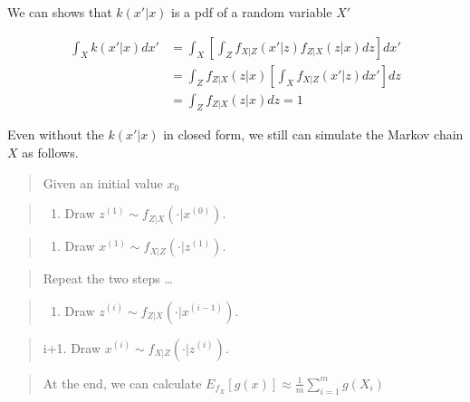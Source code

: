 \documentclass[12pt]{article}
\providecommand{\tightlist}{%
  \setlength{\itemsep}{0pt}\setlength{\parskip}{0pt}}
\begin{document}
We can shows that \(k(x'|x)\) is a pdf of a random variable \(X'\)

\[\begin{aligned}
\int_{X} k(x'|x)d x' &=\int_{X}\left[\int_{Z}f_{X|Z}(x'|z)f_{Z|X}(z|x) dz\right]dx'\\
&=\int_{Z}f_{Z|X}(z|x) \left[\int_X f_{X|Z}(x'|z)dx'\right]dz\\
&=\int_{Z}f_{Z|X}(z|x)dz=1
\end{aligned}\]

Even without the \(k(x'|x)\) in closed form, we still can simulate the
Markov chain \(X\) as follows.

\begin{quote}
Given an initial value \(x_0\)
\end{quote}

\begin{quote}
\begin{enumerate}
\def\labelenumi{\arabic{enumi}.}
\tightlist
\item
  Draw \(z^{(1)} \sim f_{Z |X}(\cdot|x^{(0)})\).
\end{enumerate}
\end{quote}

\begin{quote}
\begin{enumerate}
\def\labelenumi{\arabic{enumi}.}
\setcounter{enumi}{1}
\tightlist
\item
  Draw \(x^{(1)} \sim f_{X|Z} (\cdot|z^{(1)})\).
\end{enumerate}
\end{quote}

\begin{quote}
Repeat the two steps \ldots{}
\end{quote}

\begin{quote}
\begin{enumerate}
\def\labelenumi{\roman{enumi}.}
\tightlist
\item
  Draw \(z^{(i)} \sim f_{Z |X}(\cdot|x^{(i-1)})\).
\end{enumerate}
\end{quote}

\begin{quote}
i+1. Draw \(x^{(i)} \sim f_{X|Z} (\cdot|z^{(i)})\).
\end{quote}

\begin{quote}
At the end, we can calculate
\(E_{f_{X}}[g(x)]\approx\frac{1}{m}\sum_{i=1}^m g(X_i)\)
\end{quote}
\end{document}
